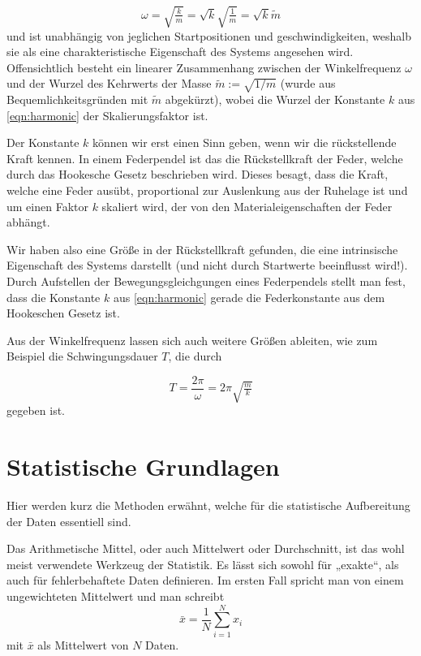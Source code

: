 \begin{equation}\label{eqn:omega}
	\omega = \sqrt{\tfrac{k}{m}} = \sqrt{k}\sqrt{\tfrac{1}{m}} = \sqrt{k}\tilde{m}
\end{equation}
und ist unabhängig von jeglichen Startpositionen und geschwindigkeiten, weshalb sie als eine charakteristische Eigenschaft des Systems angesehen wird. Offensichtlich besteht ein linearer Zusammenhang zwischen der Winkelfrequenz \( \omega \) und der Wurzel des Kehrwerts der Masse \( \tilde{m} := \sqrt{1/m} \) (wurde aus Bequemlichkeitsgründen mit \( \tilde{m} \) abgekürzt), wobei die Wurzel der Konstante \( k \) aus \autoref{eqn:harmonic} der Skalierungsfaktor ist. 

Der Konstante \( k \) können wir erst einen Sinn geben, wenn wir die rückstellende Kraft kennen. In einem Federpendel ist das die Rückstellkraft der Feder, welche durch das Hookesche Gesetz beschrieben wird. Dieses besagt, dass die Kraft, welche eine Feder ausübt, proportional zur Auslenkung aus der Ruhelage ist und um einen Faktor \( k \) skaliert wird, der von den Materialeigenschaften der Feder abhängt. 

Wir haben also eine Größe in der Rückstellkraft gefunden, die eine intrinsische Eigenschaft des Systems darstellt (und nicht durch Startwerte beeinflusst wird!). Durch Aufstellen der Bewegungsgleichgungen eines Federpendels stellt man fest, dass die Konstante \( k \) aus \autoref{eqn:harmonic} gerade die Federkonstante aus dem Hookeschen Gesetz ist.  


Aus der Winkelfrequenz lassen sich auch weitere Größen ableiten, wie zum Beispiel die Schwingungsdauer \( T \), die durch

\begin{equation}\label{eqn:T}
	T = \frac{2\pi}{\omega} = 2\pi \sqrt{\tfrac{m}{k}}
\end{equation}
gegeben ist.

\section{Statistische Grundlagen}

Hier werden kurz die Methoden erwähnt, welche für die statistische Aufbereitung der Daten essentiell sind.

Das Arithmetische Mittel, oder auch Mittelwert oder Durchschnitt, ist das wohl meist verwendete Werkzeug der Statistik. Es lässt sich sowohl  für „exakte“, als auch für fehlerbehaftete Daten definieren. Im ersten Fall spricht man von einem ungewichteten Mittelwert und man schreibt 
\begin{equation}\label{eqn:mean1}
	\bar{x} = \frac{1}{N} \sum_{i=1}^{N} x_i
\end{equation}
mit $\bar{x}$ als Mittelwert von \( N \) Daten.

